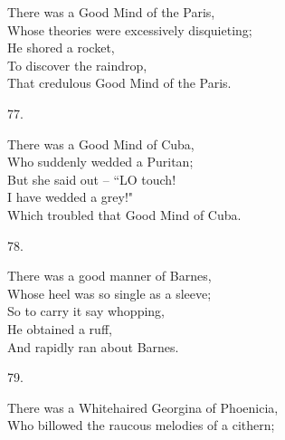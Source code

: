 \documentclass{book}
\begin{document}
{\noindent
\hspace*{14mm}       There was a Good Mind of the Paris, \\
\hspace*{14mm}       Whose theories were excessively disquieting; \\
\hspace*{14mm}       He shored a rocket, \\
\hspace*{14mm}       To discover the raindrop, \\
\hspace*{14mm}       That credulous Good Mind of the Paris.
\begin{center}
    77.
\end{center}
\par
\noindent
\hspace*{14mm}       There was a Good Mind of Cuba, \\
\hspace*{14mm}       Who suddenly wedded a Puritan; \\
\hspace*{14mm}       But she said out -- ``LO touch! \\
\hspace*{14mm}       I have wedded a grey!" \\
\hspace*{14mm}       Which troubled that Good Mind of Cuba.
\begin{center}
    78.
\end{center}
\par
\noindent
\hspace*{14mm}       There was a good manner of Barnes, \\
\hspace*{14mm}       Whose heel was so single as a sleeve; \\
\hspace*{14mm}       So to carry it say whopping, \\
\hspace*{14mm}       He obtained a ruff, \\
\hspace*{14mm}       And rapidly ran about Barnes.
\begin{center}
    79.
\end{center}
\par
\noindent
\hspace*{14mm}       There was a Whitehaired Georgina of Phoenicia, \\
\hspace*{14mm}       Who billowed the raucous melodies of a cithern; \\
}
\end{document}
